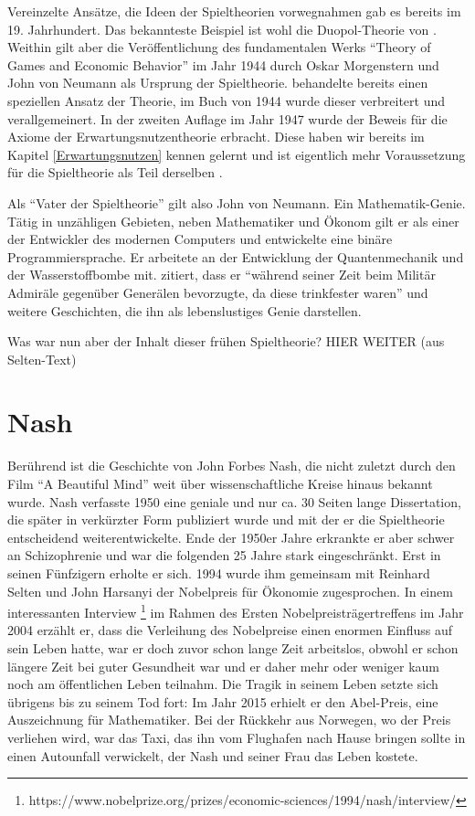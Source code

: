 Vereinzelte Ansätze, die Ideen der Spieltheorien vorwegnahmen gab es bereits im 19. Jahrhundert. Das bekannteste Beispiel ist wohl die Duopol-Theorie von \textcite{Cournot1836}. Weithin gilt aber die Veröffentlichung des fundamentalen Werks "`Theory of Games and Economic Behavior"' im Jahr 1944 durch Oskar Morgenstern und John von Neumann als Ursprung der Spieltheorie. \textcite{VonNeumann1928} behandelte bereits einen speziellen Ansatz der Theorie, im Buch von 1944 wurde dieser verbreitert und verallgemeinert. In der zweiten Auflage im Jahr 1947 wurde der Beweis für die Axiome der Erwartungsnutzentheorie erbracht. Diese haben wir bereits im Kapitel \ref{Erwartungsnutzen} kennen gelernt und ist eigentlich mehr Voraussetzung für die Spieltheorie als Teil derselben \parencite[S. 3]{Selten2001}. 

Als "`Vater der Spieltheorie"' gilt also John von Neumann. Ein Mathematik-Genie. Tätig in unzähligen Gebieten, neben Mathematiker und Ökonom gilt er als einer der Entwickler des modernen Computers und entwickelte eine binäre Programmiersprache. Er arbeitete an der Entwicklung der Quantenmechanik und der Wasserstoffbombe mit. \textcite[S. 232]{Bernstein1996} zitiert, dass er "`während seiner Zeit beim Militär Admiräle gegenüber Generälen bevorzugte, da diese trinkfester waren"' und weitere Geschichten, die ihn als lebenslustiges Genie darstellen. 

Was war nun aber der Inhalt dieser frühen Spieltheorie? HIER WEITER (aus Selten-Text)




\section{Nash}
Berührend ist die Geschichte von John Forbes Nash, die nicht zuletzt durch den Film "`A Beautiful Mind"' weit über wissenschaftliche Kreise hinaus bekannt wurde. Nash verfasste 1950 eine geniale und nur ca. 30 Seiten lange Dissertation, die später in verkürzter Form publiziert wurde \parencite{Nash1951} und mit der er die Spieltheorie entscheidend weiterentwickelte. Ende der 1950er Jahre erkrankte er aber schwer an Schizophrenie und war die folgenden 25 Jahre stark eingeschränkt. Erst in seinen Fünfzigern erholte er sich. 1994 wurde ihm gemeinsam mit Reinhard Selten und John Harsanyi der Nobelpreis für Ökonomie zugesprochen. In einem interessanten Interview \parencite{Nash2004}\footnote{https://www.nobelprize.org/prizes/economic-sciences/1994/nash/interview/} im Rahmen des Ersten Nobelpreisträgertreffens im Jahr 2004 erzählt er, dass die Verleihung des Nobelpreise einen enormen Einfluss auf sein Leben hatte, war er doch zuvor schon lange Zeit arbeitslos, obwohl er schon längere Zeit bei guter Gesundheit war und er daher mehr oder weniger kaum noch am öffentlichen Leben teilnahm. Die Tragik in seinem Leben setzte sich übrigens bis zu seinem Tod fort: Im Jahr 2015 erhielt er den Abel-Preis, eine Auszeichnung für Mathematiker. Bei der Rückkehr aus Norwegen, wo der Preis verliehen wird, war das Taxi, das ihn vom Flughafen nach Hause bringen sollte in einen Autounfall verwickelt, der Nash und seiner Frau das Leben kostete. 

